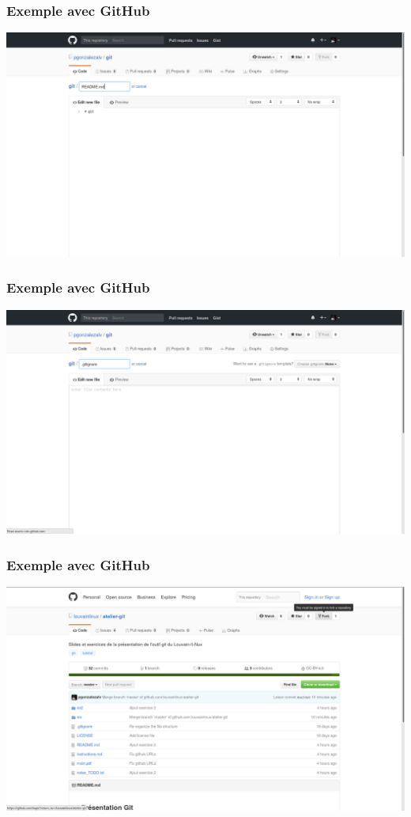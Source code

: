 \documentclass{beamer}
\begin{document}
\begin{frame}[fragile]
\frametitle{Exemple avec GitHub}
  \begin{center}
      \includegraphics[width=\textwidth]{img/github_new_project_readme}
  \end{center}
\end{frame}

\begin{frame}[fragile]
\frametitle{Exemple avec GitHub}
  \begin{center}
      \includegraphics[width=\textwidth]{img/github_new_project_gitignore}
  \end{center}
\end{frame}

\begin{frame}[fragile]
\frametitle{Exemple avec GitHub}
  \begin{center}
      \includegraphics[width=\textwidth]{img/github_new_project_fork}
  \end{center}
\end{frame}
\end{document}
